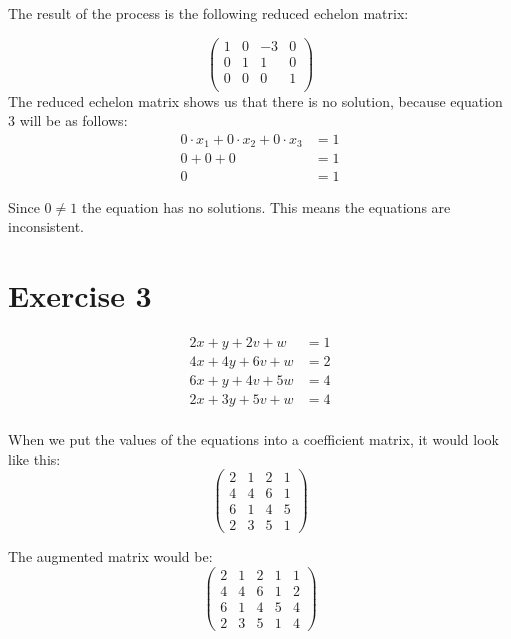 \documentclass[a4paper]{article}
\begin{document}
The result of the process is the following reduced echelon matrix:

\[
\left(
\begin{array}{ccc|c}
1 & 0 & -3 & 0   \\
0 & 1 & 1 & 0 \\
0 & 0 & 0 & 1   \\
\end{array}
\right)
\]
The reduced echelon matrix shows us that there is no solution, because equation 3 will be as follows:
\begin{align*}
  0 \cdot x_1 + 0 \cdot x_2 + 0 \cdot x_3 &= 1 \\
  0 + 0 + 0 &= 1  \\
  0 &= 1
\end{align*}

Since $0 \neq 1$ the equation has no solutions. This means the equations are inconsistent.

\section*{Exercise 3}
\begin{align*}
2x + y + 2v + w &= 1 \\
4x + 4y + 6v + w &= 2 \\
6x + y + 4v + 5w &= 4 \\
2x + 3y + 5v + w &= 4 \\
\end{align*}


When we put the values of the equations into a coefficient matrix, it would look like this: \\
\[
\left(
\begin{array}{cccc}
2 & 1 & 2 & 1   \\
4 & 4 & 6 & 1 \\
6 & 1 & 4 & 5    \\
2 & 3 & 5 & 1
\end{array}
\right)
\]

The augmented matrix would be:
\[
\left(
\begin{array}{cccc|c}
2 & 1 & 2 & 1 & 1  \\
4 & 4 & 6 & 1 & 2  \\
6 & 1 & 4 & 5 & 4  \\
2 & 3 & 5 & 1 & 4
\end{array}
\right)
\]
\end{document}
